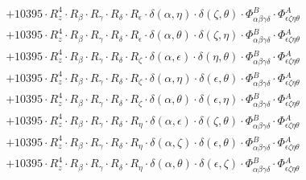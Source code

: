 \documentclass{article}
\begin{document}
\begin{equation}
\begin{array}{c}
 \\[0.2em] 		 + 10395 \cdot R_{z}^{4} \cdot R_{\beta{}} \cdot R_{\gamma{}} \cdot R_{\delta{}} \cdot R_{\epsilon{}} \cdot \delta{}\left(\alpha{}, \eta{}\right) \cdot \delta{}\left(\zeta{}, \theta{}\right) \cdot \Phi{}^{B}_{\alpha{}\beta{}\gamma{}\delta{}} \cdot \Phi{}^{A}_{\epsilon{}\zeta{}\eta{}\theta{}} 
 \\[0.2em] 		 + 10395 \cdot R_{z}^{4} \cdot R_{\beta{}} \cdot R_{\gamma{}} \cdot R_{\delta{}} \cdot R_{\epsilon{}} \cdot \delta{}\left(\alpha{}, \theta{}\right) \cdot \delta{}\left(\zeta{}, \eta{}\right) \cdot \Phi{}^{B}_{\alpha{}\beta{}\gamma{}\delta{}} \cdot \Phi{}^{A}_{\epsilon{}\zeta{}\eta{}\theta{}} 
 \\[0.2em] 		 + 10395 \cdot R_{z}^{4} \cdot R_{\beta{}} \cdot R_{\gamma{}} \cdot R_{\delta{}} \cdot R_{\zeta{}} \cdot \delta{}\left(\alpha{}, \epsilon{}\right) \cdot \delta{}\left(\eta{}, \theta{}\right) \cdot \Phi{}^{B}_{\alpha{}\beta{}\gamma{}\delta{}} \cdot \Phi{}^{A}_{\epsilon{}\zeta{}\eta{}\theta{}} 
 \\[0.2em] 		 + 10395 \cdot R_{z}^{4} \cdot R_{\beta{}} \cdot R_{\gamma{}} \cdot R_{\delta{}} \cdot R_{\zeta{}} \cdot \delta{}\left(\alpha{}, \eta{}\right) \cdot \delta{}\left(\epsilon{}, \theta{}\right) \cdot \Phi{}^{B}_{\alpha{}\beta{}\gamma{}\delta{}} \cdot \Phi{}^{A}_{\epsilon{}\zeta{}\eta{}\theta{}} 
 \\[0.2em] 		 + 10395 \cdot R_{z}^{4} \cdot R_{\beta{}} \cdot R_{\gamma{}} \cdot R_{\delta{}} \cdot R_{\zeta{}} \cdot \delta{}\left(\alpha{}, \theta{}\right) \cdot \delta{}\left(\epsilon{}, \eta{}\right) \cdot \Phi{}^{B}_{\alpha{}\beta{}\gamma{}\delta{}} \cdot \Phi{}^{A}_{\epsilon{}\zeta{}\eta{}\theta{}} 
 \\[0.2em] 		 + 10395 \cdot R_{z}^{4} \cdot R_{\beta{}} \cdot R_{\gamma{}} \cdot R_{\delta{}} \cdot R_{\eta{}} \cdot \delta{}\left(\alpha{}, \epsilon{}\right) \cdot \delta{}\left(\zeta{}, \theta{}\right) \cdot \Phi{}^{B}_{\alpha{}\beta{}\gamma{}\delta{}} \cdot \Phi{}^{A}_{\epsilon{}\zeta{}\eta{}\theta{}} 
 \\[0.2em] 		 + 10395 \cdot R_{z}^{4} \cdot R_{\beta{}} \cdot R_{\gamma{}} \cdot R_{\delta{}} \cdot R_{\eta{}} \cdot \delta{}\left(\alpha{}, \zeta{}\right) \cdot \delta{}\left(\epsilon{}, \theta{}\right) \cdot \Phi{}^{B}_{\alpha{}\beta{}\gamma{}\delta{}} \cdot \Phi{}^{A}_{\epsilon{}\zeta{}\eta{}\theta{}} 
 \\[0.2em] 		 + 10395 \cdot R_{z}^{4} \cdot R_{\beta{}} \cdot R_{\gamma{}} \cdot R_{\delta{}} \cdot R_{\eta{}} \cdot \delta{}\left(\alpha{}, \theta{}\right) \cdot \delta{}\left(\epsilon{}, \zeta{}\right) \cdot \Phi{}^{B}_{\alpha{}\beta{}\gamma{}\delta{}} \cdot \Phi{}^{A}_{\epsilon{}\zeta{}\eta{}\theta{}} 

\end{array}
\end{equation}
\end{document}
